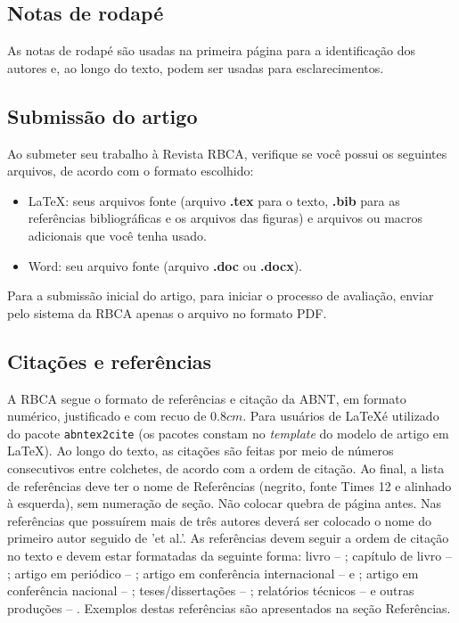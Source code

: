 \documentclass{RBCA}
\begin{document}
\subsection{Notas de rodapé}
As notas de rodapé são usadas na primeira página para a identificação dos autores e, ao longo do texto, podem ser usadas para esclarecimentos.

\subsection{Submissão do artigo}
Ao submeter seu trabalho à Revista RBCA, verifique se você possui os seguintes arquivos, de acordo com o formato escolhido:

\begin{itemize} \setlength{\parskip}{0pt}%
\item \LaTeX: seus arquivos fonte (arquivo \textbf{.tex} para o texto, \textbf{.bib} para as referências bibliográficas e os arquivos das figuras) e arquivos ou macros adicionais que você tenha usado.
\item Word: seu arquivo fonte (arquivo  \textbf{.doc} ou \textbf{.docx}).
\end{itemize}

Para a submissão inicial do artigo, para iniciar o processo de avaliação, enviar pelo sistema da RBCA apenas o arquivo no formato PDF.

\subsection{Citações e referências}
A RBCA segue o formato de referências e citação da ABNT, em formato numérico, justificado e com recuo de $0.8 cm$. Para usuários de \LaTeX é utilizado do pacote \texttt{abntex2cite} (os pacotes constam no \emph{template} do modelo de artigo em \LaTeX). Ao longo do texto, as citações são feitas por meio de números consecutivos entre colchetes, de acordo com a ordem de citação. Ao final, a lista de referências deve ter o nome de Referências (negrito, fonte Times 12 e alinhado à esquerda), sem numeração de seção. Não colocar quebra de página antes. Nas referências que possuírem mais de três autores deverá ser colocado o nome do primeiro autor seguido de 'et al.'. As referências devem seguir a ordem de citação no texto e devem estar formatadas da seguinte forma: livro -- \cite{Dongarra:2003}; capítulo de livro -- \cite{holbig2004}; artigo em periódico -- \cite{holbig2013}; artigo em conferência internacional -- \cite{holbig2014} e \cite{holbig2011}; artigo em conferência nacional -- \cite{tibuski2013}; teses/dissertações -- \cite{holbig2005}; relatórios técnicos -- \cite{holbig03c} e outras produções -- \cite{Tierney2014}. Exemplos destas referências são apresentados na seção Referências.
\end{document}
